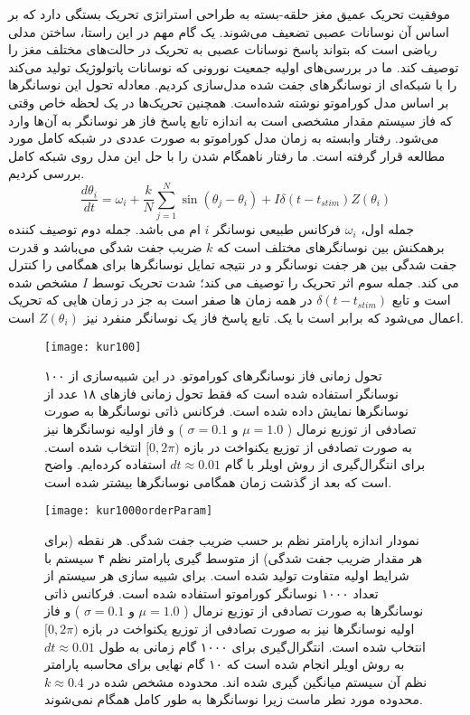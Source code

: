 موفقیت تحریک عمیق مغز حلقه-بسته به طراحی استراتژی تحریک بستگی دارد که بر اساس آن نوسانات عصبی تضعیف می‌شوند. یک گام مهم در این راستا، ساختن مدلی ریاضی است که بتواند پاسخ نوسانات عصبی به تحریک در حالت‌های مختلف مغز را توصیف کند.
ما در بررسی‌های اولیه جمعیت نورونی که نوسانات پاتولوژیک تولید می‌کند را با شبکه‌ای از نوسانگرهای جفت شده مدل‌سازی کردیم. معادله تحول این نوسانگرها بر اساس مدل کوراموتو نوشته شده‌است. همچنین تحریک‌ها در یک لحظه خاص وقتی که فاز سیستم مقدار مشخصی است به اندازه تابع پاسخ فاز هر نوسانگر به آن‌ها وارد می‌شود.
رفتار وابسته به زمان مدل کوراموتو به صورت عددی در شبکه کامل مورد مطالعه قرار گرفته است. ما رفتار ناهمگام شدن را با حل این مدل روی شبکه کامل بررسی کردیم.
\begin{equation}
    \frac{d \theta_i}{dt} = \omega_i + \frac{k}{N} \sum_{j=1}^{N} \sin(\theta_j -\theta_i) + I \delta(t-t_{stim}) Z(\theta_i)
    \label{eq:kuramotoModelres}
\end{equation}
جمله اول، 
$\omega_i$
فرکانس طبیعی نوسانگر 
$i$ 
ام می باشد.
جمله دوم توصیف کننده برهمکنش بین نوسانگرهای مختلف است که 
$k$
ضریب جفت شدگی می‌باشد و قدرت جفت شدگی بین هر جفت نوسانگر و در نتیجه تمایل نوسانگرها برای همگامی را کنترل می کند. 
جمله سوم اثر تحریک را توصیف می کند؛ شدت تحریک توسط 
$I$
مشخص شده است و تابع 
$\delta(t-t_{stim})$
در همه زمان ها صفر است به جز در زمان هایی که تحریک اعمال می‌شود که برابر است با یک.
تابع پاسخ فاز یک نوسانگر منفرد نیز
$Z(\theta_i)$
است.

\begin{figure}
	\centering
	\texttt{[image: kur100]}
    \caption{
تحول زمانی فاز نوسانگرهای کوراموتو. در این شبیه‌سازی از ۱۰۰ نوسانگر استفاده شده است که فقط تحول زمانی فازهای ۱۸ عدد از نوسانگرها نمایش داده شده است. فرکانس ذاتی نوسانگرها به صورت تصادفی از توزیع نرمال (
$\mu=1.0$  و $\sigma=0.1$
) و فاز اولیه نوسانگرها نیز به صورت تصادفی از توزیع یکنواخت در بازه 
$[0,2\pi)$
انتخاب شده است. برای انتگرال‌گیری از روش اویلر با گام 
$dt\approx 0.01$
استفاده کرده‌ایم. واضح است که بعد از گذشت زمان همگامی نوسانگرها بیشتر شده است.
    }
\end{figure}



\begin{figure}
	\centering
	\texttt{[image: kur1000orderParam]}
    \caption{
نمودار اندازه پارامتر نظم بر حسب ضریب جفت شدگی. هر نقطه (برای هر مقدار ضریب جفت شدگی) از متوسط گیری پارامتر نظم ۴ سیستم با شرایط اولیه متفاوت تولید شده است. برای شبیه سازی هر سیستم از تعداد ۱۰۰۰ نوسانگر کوراموتو استفاده شده است. فرکانس ذاتی نوسانگرها به صورت تصادفی از توزیع نرمال (
$\mu=1.0$  و $\sigma=0.1$
) و فاز اولیه نوسانگرها نیز به صورت تصادفی از توزیع یکنواخت در بازه 
$[0,2\pi)$
انتخاب شده است. انتگرال‌گیری برای ۱۰۰۰ گام زمانی به طول
 $dt \approx 0.01$
 به روش اویلر انجام شده است که ۱۰ گام نهایی برای محاسبه پارامتر نظم آن سیستم میانگین گیری شده اند. محدوده مشخص شده در 
 $k \approx 0.4$
 محدوده مورد نطر ماست زیرا نوسانگرها به طور کامل همگام نمی‌شوند.
    }
    \label{fig:orderParam-k}
\end{figure}

